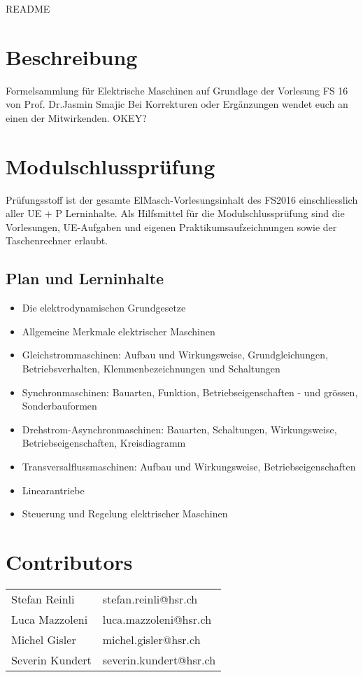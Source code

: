 \thispagestyle{empty}
\setcounter{page}{0} %
{\huge README }
\section*{Beschreibung}
Formelsammlung für Elektrische Maschinen auf Grundlage der Vorlesung FS 16 von Prof. Dr.Jasmin Smajic \newline
Bei Korrekturen oder Ergänzungen wendet euch an einen der Mitwirkenden.
OKEY?

\section*{Modulschlussprüfung}
Prüfungsstoff ist der gesamte ElMasch-Vorlesungsinhalt des FS2016 einschliesslich aller UE + P Lerninhalte.\newline
Als Hilfsmittel für die Modulschlussprüfung sind die Vorlesungen,\newline
UE-Aufgaben und eigenen Praktikumsaufzeichnungen sowie der Taschenrechner erlaubt.

\subsection*{Plan und Lerninhalte}
{\scriptsize 
\begin{itemize}
    \item Die elektrodynamischen Grundgesetze 
    \item Allgemeine Merkmale elektrischer Maschinen 
    \item Gleichstrommaschinen: 
    \subitem Aufbau und Wirkungsweise, Grundgleichungen, Betriebsverhalten, Klemmenbezeichnungen und Schaltungen 
    \item Synchronmaschinen: Bauarten, Funktion, Betriebseigenschaften - und grössen, Sonderbauformen 
    \item Drehstrom-Asynchronmaschinen: 
    \subitem Bauarten, Schaltungen, Wirkungsweise, Betriebseigenschaften, Kreisdiagramm 
    \item Transversalflussmaschinen: Aufbau und Wirkungsweise, Betriebseigenschaften
    \item Linearantriebe
    \item Steuerung und Regelung elektrischer Maschinen
\end{itemize}
}
\vfill
\section*{Contributors}
\begin{tabular}{ll}
	Stefan Reinli   & stefan.reinli@hsr.ch   \\
	Luca Mazzoleni  & luca.mazzoleni@hsr.ch  \\
	Michel Gisler   & michel.gisler@hsr.ch   \\
	Severin Kundert & severin.kundert@hsr.ch
\end{tabular} 

